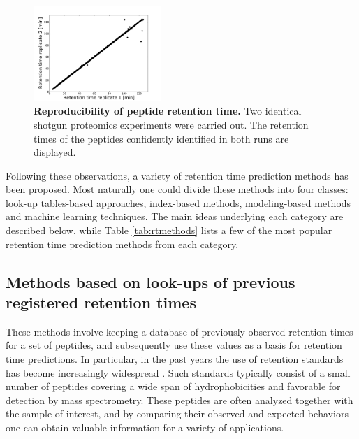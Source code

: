 \documentclass[a4paper]{article}
\begin{document}
\begin{figure}
\vspace{-10pt}
\centering
\includegraphics[trim=0.5cm 0cm 2cm 1.5cm, clip=true, width=0.43\textwidth]{img/reproducibility.pdf}
\caption{\label{fig:repr} {\bf Reproducibility of peptide retention time.} Two identical shotgun proteomics experiments were carried out. The retention times of the peptides confidently identified in both runs are displayed.}
\vspace{-25pt}
\end{figure}

Following these observations, a variety of retention time prediction
methods has been proposed. Most naturally one could divide these
methods into four classes: look-up tables-based approaches,
index-based methods, modeling-based methods and machine learning
techniques. The main ideas underlying each category are described
below, while Table \ref{tab:rtmethods} lists a few of the most popular
retention time prediction methods from each category.

\subsection{Methods based on look-ups of previous registered retention times}

These methods involve keeping a database of previously observed
retention times for a set of peptides, and subsequently use these
values as a basis for retention time predictions. In particular, in
the past years the use of retention standards has become increasingly
widespread \cite{olegstd, irt}. Such standards typically consist of a
small number of peptides covering a wide span of hydrophobicities and
favorable for detection by mass spectrometry. These peptides are often
analyzed together with the sample of interest, and by comparing their
observed and expected behaviors one can obtain valuable information
for a variety of applications.
\end{document}
